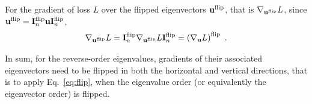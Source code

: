 For the gradient of loss $L$ over the flipped eigenvectors $\mathbf{u}^{\text{flip}}$, that is $\nabla_{\mathbf{u}^{\text{flip}}} L$, since $\mathbf{u}^{\text{flip}}=\mathbf{I}^{\text{flip}}_n \mathbf{u} \mathbf{I}^{\text{flip}}_n$,
\begin{equation}
    \nabla_{\mathbf{u}^{\text{flip}}} L
    = \mathbf{I}^{\text{flip}}_n \nabla_{\mathbf{u}^{\text{flip}}} L \mathbf{I}^{\text{flip}}_n
    = \left( \nabla_{\mathbf{u}} L \right)^{\text{flip}} \ .
\end{equation}

In sum, for the reverse-order eigenvalues, gradients of their associated eigenvectors need to be flipped in both the horizontal and vertical directions, that is to apply Eq.~\eqref{eq:flip}, when the eigenvalue order (or equivalently the eigenvector order) is flipped.

